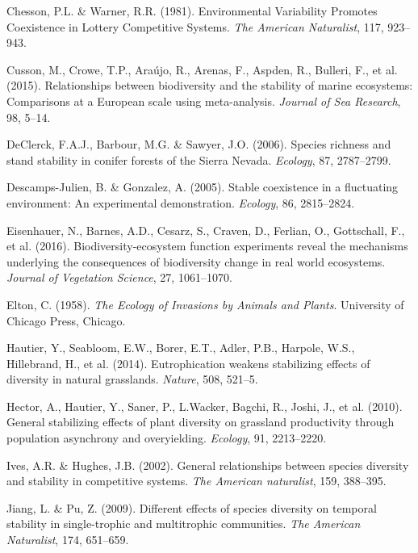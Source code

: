 \documentclass[12pt,]{article}
\begin{document}
\hypertarget{ref-Chesson1981a}{}
Chesson, P.L. \& Warner, R.R. (1981). Environmental Variability Promotes
Coexistence in Lottery Competitive Systems. \emph{The American
Naturalist}, 117, 923--943.

\hypertarget{ref-Cusson2015}{}
Cusson, M., Crowe, T.P., Araújo, R., Arenas, F., Aspden, R., Bulleri,
F., et al. (2015). Relationships between biodiversity and the stability
of marine ecosystems: Comparisons at a European scale using
meta-analysis. \emph{Journal of Sea Research}, 98, 5--14.

\hypertarget{ref-DeClerck2006}{}
DeClerck, F.A.J., Barbour, M.G. \& Sawyer, J.O. (2006). Species richness
and stand stability in conifer forests of the Sierra Nevada.
\emph{Ecology}, 87, 2787--2799.

\hypertarget{ref-Descamps-Julien2005}{}
Descamps-Julien, B. \& Gonzalez, A. (2005). Stable coexistence in a
fluctuating environment: An experimental demonstration. \emph{Ecology},
86, 2815--2824.

\hypertarget{ref-Eisenhauer2016}{}
Eisenhauer, N., Barnes, A.D., Cesarz, S., Craven, D., Ferlian, O.,
Gottschall, F., et al. (2016). Biodiversity-ecosystem function
experiments reveal the mechanisms underlying the consequences of
biodiversity change in real world ecosystems. \emph{Journal of
Vegetation Science}, 27, 1061--1070.

\hypertarget{ref-Elton1958}{}
Elton, C. (1958). \emph{The Ecology of Invasions by Animals and Plants}.
University of Chicago Press, Chicago.

\hypertarget{ref-Hautier2014}{}
Hautier, Y., Seabloom, E.W., Borer, E.T., Adler, P.B., Harpole, W.S.,
Hillebrand, H., et al. (2014). Eutrophication weakens stabilizing
effects of diversity in natural grasslands. \emph{Nature}, 508, 521--5.

\hypertarget{ref-Hector2010}{}
Hector, A., Hautier, Y., Saner, P., L.Wacker, Bagchi, R., Joshi, J., et
al. (2010). General stabilizing effects of plant diversity on grassland
productivity through population asynchrony and overyielding.
\emph{Ecology}, 91, 2213--2220.

\hypertarget{ref-Ives2002b}{}
Ives, A.R. \& Hughes, J.B. (2002). General relationships between species
diversity and stability in competitive systems. \emph{The American
naturalist}, 159, 388--395.

\hypertarget{ref-Jiang2009}{}
Jiang, L. \& Pu, Z. (2009). Different effects of species diversity on
temporal stability in single-trophic and multitrophic communities.
\emph{The American Naturalist}, 174, 651--659.
\end{document}
